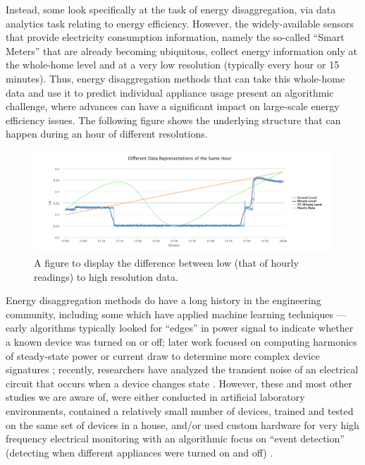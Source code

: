 Instead, some look specifically at the task of energy disaggregation, via data analytics task relating to energy efficiency. However, the widely-available sensors that provide electricity consumption information, namely the so-called “Smart Meters” that are already becoming ubiquitous, collect energy information only at the whole-home level and at a very low resolution (typically every hour or 15 minutes). Thus, energy disaggregation methods that can take this whole-home data and use it to predict individual appliance usage present an algorithmic challenge, where advances can have a significant impact on large-scale energy efficiency issues. The following figure shows the underlying structure that can happen during an hour of different resolutions.

\begin{figure}[H]
\hspace*{-0.5cm}
	\includegraphics[scale=0.37]{./figures/hourlyexamplefixed.png}
	\caption{A figure to display the difference between low (that of hourly readings) to high resolution data. \protect\footnotemark}
	\label{fig:hourex}
\end{figure}

Energy disaggregation methods do have a long history in the engineering community, including some which have applied machine learning techniques — early algorithms \cite{hart} typically looked for “edges” in power signal to indicate whether a known device was turned on or off; later work focused on computing harmonics of steady-state power or current draw to determine more complex device signatures \cite{load}; recently, researchers have analyzed the transient noise of an electrical circuit that occurs when a device changes state \cite{patel}. However, these and most other studies we are aware of, were either conducted in artificial laboratory environments, contained a relatively small number of devices, trained and tested on the same set of devices in a house, and/or used custom hardware for very high frequency electrical monitoring with an algorithmic focus on “event detection” (detecting when different appliances were turned on and off) \cite{DDSC}.

